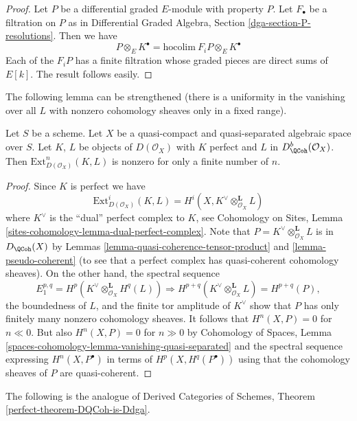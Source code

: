\begin{proof}
Let $P$ be a differential graded $E$-module with property $P$.
Let $F_\bullet$ be a filtration on $P$ as in
Differential Graded Algebra, Section \ref{dga-section-P-resolutions}.
Then we have
$$
P \otimes_E K^\bullet = \text{hocolim}\ F_iP \otimes_E K^\bullet
$$
Each of the $F_iP$ has a finite filtration whose graded pieces
are direct sums of $E[k]$. The result follows easily.
\end{proof}

\noindent
The following lemma can be strengthened (there is a uniformity
in the vanishing over all $L$ with nonzero cohomology sheaves
only in a fixed range).

\begin{lemma}
\label{lemma-ext-from-perfect-into-bounded-QCoh}
Let $S$ be a scheme.
Let $X$ be a quasi-compact and quasi-separated algebraic space over $S$.
Let $K$, $L$ be objects of $D(\mathcal{O}_X)$ with
$K$ perfect and $L$ in $D^b_\QCoh(\mathcal{O}_X)$.
Then $\text{Ext}^n_{D(\mathcal{O}_X)}(K, L)$ is nonzero
for only a finite number of $n$.
\end{lemma}

\begin{proof}
Since $K$ is perfect we have
$$
\text{Ext}^i_{D(\mathcal{O}_X)}(K, L) =
H^i(X, K^\vee \otimes_{\mathcal{O}_X}^\mathbf{L} L)
$$
where $K^\vee$ is the ``dual'' perfect complex to $K$, see
Cohomology on Sites, Lemma \ref{sites-cohomology-lemma-dual-perfect-complex}.
Note that $P = K^\vee \otimes_{\mathcal{O}_X}^\mathbf{L} L$
is in $D_\QCoh(X)$ by
Lemmas \ref{lemma-quasi-coherence-tensor-product} and
\ref{lemma-pseudo-coherent} (to see that a perfect complex
has quasi-coherent cohomology sheaves). On the other hand,
the spectral sequence
$$
E_1^{p, q} = H^p(K^\vee \otimes_{\mathcal{O}_X}^\mathbf{L} H^q(L))
\Rightarrow
H^{p + q}(K^\vee \otimes_{\mathcal{O}_X}^\mathbf{L} L) = H^{p + q}(P),
$$
the boundedness of $L$, and the finite tor amplitude of $K^\vee$
show that $P$ has only finitely many nonzero cohomology sheaves.
It follows that $H^n(X, P) = 0$ for $n \ll 0$.
But also $H^n(X, P) = 0$ for $n \gg 0$ by
Cohomology of Spaces, Lemma
\ref{spaces-cohomology-lemma-vanishing-quasi-separated}
and the spectral sequence expressing $H^n(X, P^\bullet)$
in terms of $H^p(X, H^q(P^\bullet))$ using that the cohomology
sheaves of $P$ are quasi-coherent.
\end{proof}

\noindent
The following is the analogue of
Derived Categories of Schemes, Theorem \ref{perfect-theorem-DQCoh-is-Ddga}.

